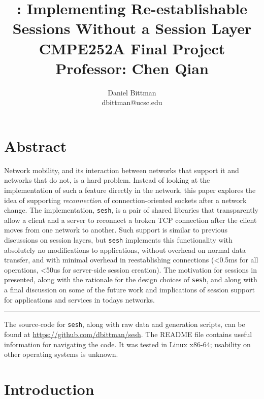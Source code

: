 \documentclass[twocolumn,11pt]{article}
\author{Daniel Bittman \\ dbittman@ucsc.edu}
\title{\sesh: \textbf{Implementing Re-establishable\\Sessions Without a Session Layer}
\\
{\vspace{5mm}\normalsize CMPE252A Final Project\\\vspace{-3mm} Professor: Chen Qian}
}
\newcommand{\sesh}{\texttt{sesh}\xspace}
\begin{document}
\biolinum
\maketitle
\libertine
\renewcommand\ttdefault{lmtt}

\section*{Abstract}

Network mobility, and its interaction between networks that support it and
networks that do not, is a hard problem. Instead of looking at the implementation
of such a feature directly in the network, this paper explores the idea of
supporting \textit{reconnection} of connection-oriented sockets after a network
change. The implementation, \sesh, is a pair of shared libraries that
transparently allow a client and a server to reconnect a broken TCP connection
after the client moves from one network to another. Such support is similar to
previous discussions on session layers, but \sesh implements this functionality
with absolutely no modifications to applications, without overhead on normal
data transfer, and with minimal overhead in reestablishing connections (<0.5ms
for all operations, <50us for server-side session creation). The
motivation for sessions in presented, along with the rationale for the design
choices of \sesh, and along with a final discussion on some of the future work
and implications of session support for applications and services in todays
networks.

\begin{center}\noindent\rule{2cm}{0.4pt}\end{center}

The source-code for \sesh, along with raw data and generation scripts,
can be found at \url{https://github.com/dbittman/sesh}. The README file contains
useful information for navigating the code. It was tested in Linux x86-64;
usability on other operating systems is unknown.

\section{Introduction}
\end{document}

